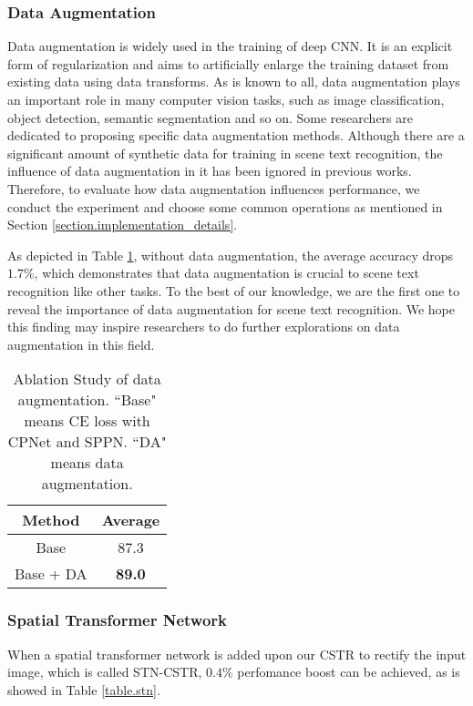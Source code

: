 \documentclass[final]{cvpr}
\begin{document}
\subsubsection{Data Augmentation}
Data augmentation is widely used in the training of deep CNN. It is an explicit form of regularization and aims to artificially enlarge the training dataset from existing data using data transforms. As is known to all, data augmentation plays an important role in many computer vision tasks, such as image classification, object detection, semantic segmentation and so on. Some researchers are dedicated to proposing specific data augmentation methods. Although there are a significant amount of synthetic data for training in scene text recognition, the influence of data augmentation in it has been ignored in previous works. Therefore, to evaluate how data augmentation influences performance, we conduct the experiment and choose some common operations as mentioned in Section \ref{section.implementation_details}. 

As depicted in Table \ref{table.data_augmentation}, without data augmentation, the average accuracy drops $1.7\%$, which demonstrates that data augmentation is crucial to scene text recognition like other tasks. To the best of our knowledge, we are the first one to reveal the importance of data augmentation for scene text recognition. We hope this finding may inspire researchers to do further explorations on data augmentation in this field.

\begin{table}[ht]
    \caption{Ablation Study of data augmentation.  ``Base" means CE loss with CPNet and SPPN. ``DA" means data augmentation.}
    \label{table.data_augmentation}
	\centering
	\begin{tabular}{ | c | c |}
		\hline
		 	Method & Average \\ 
		\hline
		Base & 87.3\\
		\hline
		Base + DA & \textbf{89.0}\\
		\hline
	\end{tabular}
\end{table}

\subsubsection{Spatial Transformer Network}
When a spatial transformer network is added upon our CSTR to rectify the input image, which is called STN-CSTR, $0.4\%$ perfomance boost can be achieved, as is showed in Table \ref{table.stn}.
\end{document}
